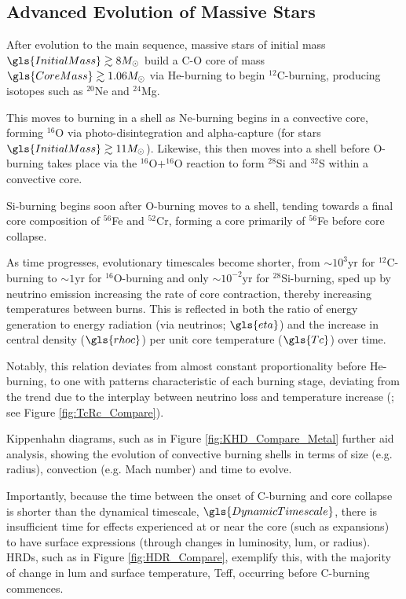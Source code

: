 \subsection{Advanced Evolution of Massive Stars}\label{sec:AdvancedEvolution}

After evolution to the main sequence, massive stars of initial mass $\gls{InitialMass} \gtrsim 8M_{\odot}$ build a C-O core of mass $\gls{CoreMass} \gtrsim 1.06M_{\odot}$ via He-burning to begin $^{12}$C-burning, producing isotopes such as $^{20}$Ne and $^{24}$Mg.

This moves to burning in a shell as Ne-burning begins in a convective core, forming $^{16}$O via photo-disintegration and alpha-capture (for stars $\gls{InitialMass} \gtrsim 11M_{\odot}$).
Likewise, this then moves into a shell before O-burning takes place via the $^{16}$O$+^{16}$O reaction to form $^{28}$Si and $^{32}$S within a convective core. 

Si-burning begins soon after O-burning moves to a shell, tending towards a final core composition of $^{56}$Fe and $^{52}$Cr, forming a core primarily of $^{56}$Fe before core collapse. 

As time progresses, evolutionary timescales become shorter, from $\sim 10^{3}\mathrm{yr}$ for $^{12}$C-burning to $\sim 1\mathrm{yr}$ for $^{16}$O-burning and only $\sim 10^{-2}\mathrm{yr}$ for $^{28}$Si-burning, sped up by neutrino emission increasing the rate of core contraction, thereby increasing temperatures between burns. This is reflected in both the ratio of energy generation to energy radiation (via neutrinos; $\gls{eta}$) and the increase in central density ($\gls{rhoc}$) per unit core temperature ($\gls{Tc}$) over time.

Notably, this relation deviates from almost constant proportionality before He-burning, to one with patterns characteristic of each burning stage, deviating from the trend due to the interplay between neutrino loss and temperature increase (\citealp{Polls11}; see Figure \ref{fig:TcRc_Compare}). 



Kippenhahn diagrams, such as in Figure \ref{fig:KHD_Compare_Metal} further aid analysis, showing the evolution of convective burning shells in terms of size (e.g. radius), convection (e.g. Mach number) and time to evolve. 

%


Importantly, because the time between the onset of C-burning and core collapse is shorter than the dynamical timescale, $\gls{DynamicTimescale}$, there is insufficient time for effects experienced at or near the core (such as expansions) to have surface expressions (through changes in luminosity, \gls{lum}, or radius). \glspl{HRD}, such as in Figure \ref{fig:HDR_Compare}, exemplify this, with the majority of change in \gls{lum} and surface temperature, \gls{Teff}, occurring before C-burning commences.  

